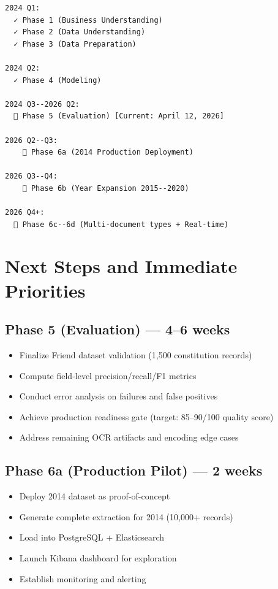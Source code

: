 \documentclass[12pt,a4paper]{report}
\begin{document}
\begin{verbatim}
2024 Q1:
  ✓ Phase 1 (Business Understanding)
  ✓ Phase 2 (Data Understanding)
  ✓ Phase 3 (Data Preparation)

2024 Q2:
  ✓ Phase 4 (Modeling)

2024 Q3--2026 Q2:
  🔄 Phase 5 (Evaluation) [Current: April 12, 2026]

2026 Q2--Q3:
    📅 Phase 6a (2014 Production Deployment)

2026 Q3--Q4:
    📅 Phase 6b (Year Expansion 2015--2020)

2026 Q4+:
  📅 Phase 6c--6d (Multi-document types + Real-time)
\end{verbatim}

\section{Next Steps and Immediate Priorities}

\subsection{Phase 5 (Evaluation) — 4--6 weeks}

\begin{itemize}
    \item Finalize Friend dataset validation (1,500 constitution records)
    \item Compute field-level precision/recall/F1 metrics
    \item Conduct error analysis on failures and false positives
    \item Achieve production readiness gate (target: 85--90/100 quality score)
    \item Address remaining OCR artifacts and encoding edge cases
\end{itemize}

\subsection{Phase 6a (Production Pilot) — 2 weeks}

\begin{itemize}
    \item Deploy 2014 dataset as proof-of-concept
    \item Generate complete extraction for 2014 (10,000+ records)
    \item Load into PostgreSQL + Elasticsearch
    \item Launch Kibana dashboard for exploration
    \item Establish monitoring and alerting
\end{itemize}
\end{document}
